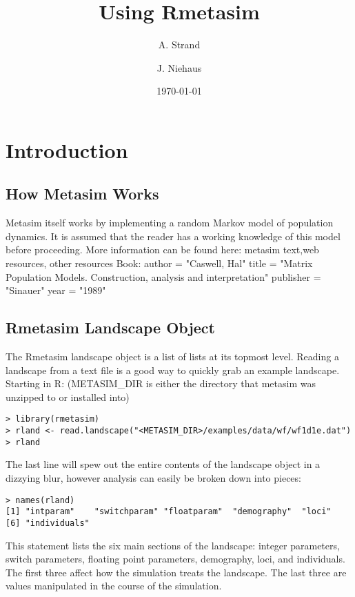 \documentclass{article}
\begin{document}
\title{Using Rmetasim}
\author{A. Strand \and J. Niehaus}
\date{\today}

\maketitle

\section{Introduction}

\subsection{How Metasim Works}
Metasim itself works by implementing a random Markov model of population dynamics.  It is assumed that the reader has a working knowledge of this model before proceeding.  More information can be found here: metasim text,web resources, other resources Book:   
author =    "Caswell, Hal"
title =     "Matrix Population Models.  Construction, analysis and interpretation"
publisher = "Sinauer"
year =      "1989"

\subsection{Rmetasim Landscape Object}
The Rmetasim landscape object is a list of lists at its topmost level.  Reading a landscape from a text file is a good way to quickly grab an example landscape.  Starting in R: (METASIM\_DIR is either the directory that metasim was unzipped to or installed into)

\begin{verbatim}
> library(rmetasim)
> rland <- read.landscape("<METASIM_DIR>/examples/data/wf/wf1d1e.dat")
> rland
\end{verbatim}

The last line will spew out the entire contents of the landscape object in a dizzying blur, however analysis can easily be broken down into pieces:

\begin{verbatim}
> names(rland)
[1] "intparam"    "switchparam" "floatparam"  "demography"  "loci"
[6] "individuals"
\end{verbatim}

This statement lists the six main sections of the landscape: integer parameters, switch parameters, floating point parameters, demography, loci, and individuals.  The first three affect how the simulation treats the landscape.  The last three are values manipulated in the course of the simulation.  
\end{document}
